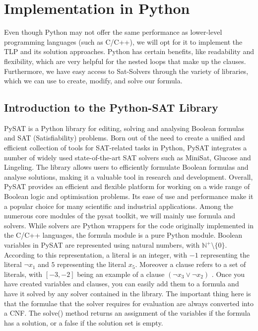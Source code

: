 \documentclass[bachelor, english]{algothesis}
\begin{document}
\chapter{Implementation in Python}
Even though Python may not offer the same performance as lower-level programming languages (such as C/C++), we will opt for it to implement the TLP and its solution approaches. Python has certain benefits, like readability and flexibility, which are very helpful for the nested loops that make up the clauses. Furthermore, we have easy access to Sat-Solvers through the variety of libraries, which we can use to create, modify, and solve our formula.

\section{Introduction to the Python-SAT Library}
PySAT is a Python library for editing, solving and analysing Boolean formulas and SAT (Satisfiability) problems. Born out of the need to create a unified and efficient collection of tools for SAT-related tasks in Python, PySAT integrates a number of widely used state-of-the-art SAT solvers such as MiniSat, Glucose and Lingeling. The library allows users to efficiently formulate Boolean formulas and analyse solutions, making it a valuable tool in research and development. Overall, PySAT provides an efficient and flexible platform for working on a wide range of Boolean logic and optimisation problems. Its ease of use and performance make it a popular choice for many scientific and industrial applications. \newline
Among the numerous core modules of the pysat toolkit, we will mainly use formula and solvers. While solvers are Python wrappers for the code originally implemented in the C/C++ languages, the formula module is a pure Python module. Boolean variables in PySAT are represented using natural numbers, with $\mathbb{N}^+\setminus\{0\}$. According to this representation, a literal is an integer, with $-1$ representing the literal $\lnot x_1$ and $5$ representing the literal $x_5$. Moreover a clause refers to a set of literals, with $[-3, -2]$ being an example of a clause $(\lnot x_3 \lor \lnot x_2)$ \cite{PySAT}. Once you have created variables and clauses, you can easily add them to a formula and have it solved by any solver contained in the library. The important thing here is that the formulae that the solver requires for evaluation are always converted into a CNF. The solve() method returns an assignment of the variables if the formula has a solution, or a false if the solution set is empty. \newline
\end{document}
